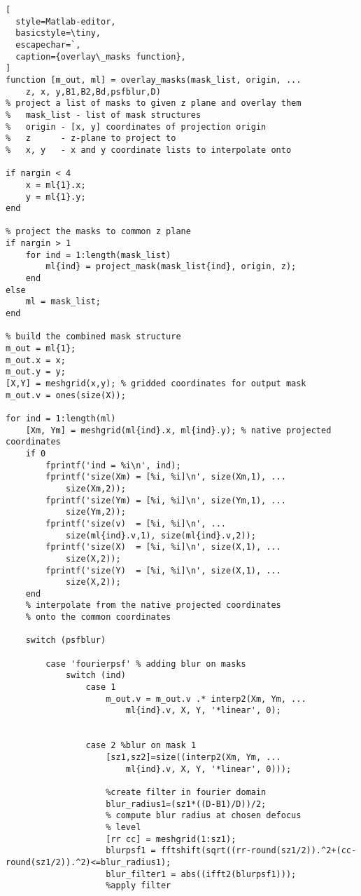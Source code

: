 \begin{lstlisting}[
  style=Matlab-editor,
  basicstyle=\tiny,
  escapechar=`,
  caption={overlay\_masks function},
]
function [m_out, ml] = overlay_masks(mask_list, origin, ...
    z, x, y,B1,B2,Bd,psfblur,D)
% project a list of masks to given z plane and overlay them
%   mask_list - list of mask structures
%   origin - [x, y] coordinates of projection origin
%   z      - z-plane to project to
%   x, y   - x and y coordinate lists to interpolate onto

if nargin < 4
    x = ml{1}.x;
    y = ml{1}.y;
end

% project the masks to common z plane
if nargin > 1
    for ind = 1:length(mask_list)
        ml{ind} = project_mask(mask_list{ind}, origin, z);
    end
else
    ml = mask_list;
end

% build the combined mask structure
m_out = ml{1};
m_out.x = x;
m_out.y = y;
[X,Y] = meshgrid(x,y); % gridded coordinates for output mask
m_out.v = ones(size(X));

for ind = 1:length(ml)
    [Xm, Ym] = meshgrid(ml{ind}.x, ml{ind}.y); % native projected coordinates
    if 0
        fprintf('ind = %i\n', ind);
        fprintf('size(Xm) = [%i, %i]\n', size(Xm,1), ...
            size(Xm,2));
        fprintf('size(Ym) = [%i, %i]\n', size(Ym,1), ...
            size(Ym,2));
        fprintf('size(v)  = [%i, %i]\n', ...
            size(ml{ind}.v,1), size(ml{ind}.v,2));
        fprintf('size(X)  = [%i, %i]\n', size(X,1), ...
            size(X,2));
        fprintf('size(Y)  = [%i, %i]\n', size(X,1), ...
            size(X,2));
    end
    % interpolate from the native projected coordinates
    % onto the common coordinates
    
    switch (psfblur)
        
        case 'fourierpsf' % adding blur on masks
            switch (ind)
                case 1
                    m_out.v = m_out.v .* interp2(Xm, Ym, ...
                        ml{ind}.v, X, Y, '*linear', 0);
                    
                    
                case 2 %blur on mask 1
                    [sz1,sz2]=size((interp2(Xm, Ym, ...
                        ml{ind}.v, X, Y, '*linear', 0)));
                    
                    %create filter in fourier domain
                    blur_radius1=(sz1*((D-B1)/D))/2; 
                    % compute blur radius at chosen defocus 
                    % level
                    [rr cc] = meshgrid(1:sz1);
                    blurpsf1 = fftshift(sqrt((rr-round(sz1/2)).^2+(cc-round(sz1/2)).^2)<=blur_radius1);
                    blur_filter1 = abs((ifft2(blurpsf1)));
                    %apply filter
                    

\end{lstlisting}
